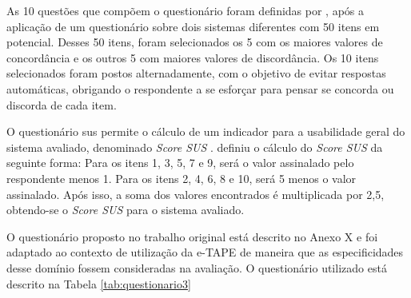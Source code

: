 \par
As 10 questões que compõem o questionário foram definidas por , após a aplicação de um questionário sobre dois sistemas diferentes com 50 itens em potencial. Desses 50 itens, foram selecionados os 5 com os maiores valores de concordância e os outros 5 com maiores valores de discordância. Os 10 itens selecionados
foram postos alternadamente, com o objetivo de evitar respostas automáticas, obrigando o respondente a se esforçar para pensar se concorda ou discorda de cada item. 

\par
O questionário \acrshort{sus} permite o cálculo de um indicador para a usabilidade geral do sistema avaliado, denominado \textit{Score SUS} . 
 definiu o cálculo do \textit{Score SUS} da seguinte forma:
Para os itens 1, 3, 5, 7 e 9, será o valor assinalado pelo respondente menos 1. Para os itens 2, 4, 6, 8 e 10, será 5 menos o valor assinalado. Após isso, a soma dos valores 
encontrados é multiplicada por 2,5, obtendo-se o \textit{Score SUS} para o sistema avaliado.

\par
O questionário proposto no trabalho original está descrito no Anexo X e  foi adaptado ao contexto de utilização da e-TAPE de maneira que as especificidades desse domínio fossem consideradas na avaliação. O questionário utilizado está descrito na Tabela \ref{tab:questionario3}

